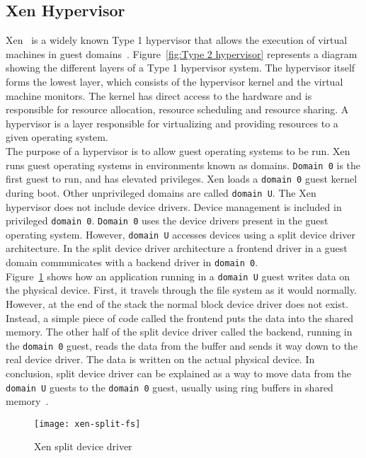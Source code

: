 \subsection{Xen Hypervisor}
Xen~\cite{barham2003xen} is a widely known Type 1 hypervisor that allows the execution of virtual machines in guest domains~\cite{king2003operating}. Figure~\ref{fig:Type 2 hypervisor} represents a diagram showing the different layers of a Type 1 hypervisor system. The hypervisor itself forms the lowest layer, which consists of the hypervisor kernel and the virtual machine monitors. The kernel has direct access to the hardware and is responsible for resource allocation, resource scheduling and resource sharing. A hypervisor is a layer responsible for virtualizing and providing resources to a given operating system.
\\[3mm]
The purpose of a hypervisor is to allow guest operating systems to be run. Xen runs guest operating systems in environments known as domains. \texttt{Domain 0} is the first guest to run, and has elevated privileges. Xen loads a \texttt{domain 0} guest kernel during boot. Other unprivileged domains are called \texttt{domain U}. The Xen hypervisor does not include device drivers. Device management is included in privileged \texttt{domain 0}. \texttt{Domain 0} uses the device drivers present in the guest operating system. However, \texttt{domain U} accesses devices using a split device driver architecture. In the split device driver architecture a frontend driver in a guest domain communicates with a backend driver in \texttt{domain 0}.
\\[3mm]
Figure~\ref{xen-split2} shows how an application running in a \texttt{domain U} guest writes data on the physical device. First, it travels through the file system as it would normally. However, at the end of the stack the normal block device driver does not exist. Instead, a simple piece of code called the frontend puts the data into the shared memory. The other half of the split device driver called the backend, running in the \texttt{domain 0} guest, reads the data from the buffer and sends it way down to the real device driver. The data is written on the actual physical device. In conclusion, split device driver can be explained as a way to move data from the \texttt{domain U} guests to the \texttt{domain 0} guest, usually using ring buffers in shared memory~\cite{Chisnall:2007:DGX:1407351}.
\begin{figure}[!h]
\centering
\texttt{[image: xen-split-fs]}
\caption{Xen split device driver}
\label{xen-split2}
\end{figure}
